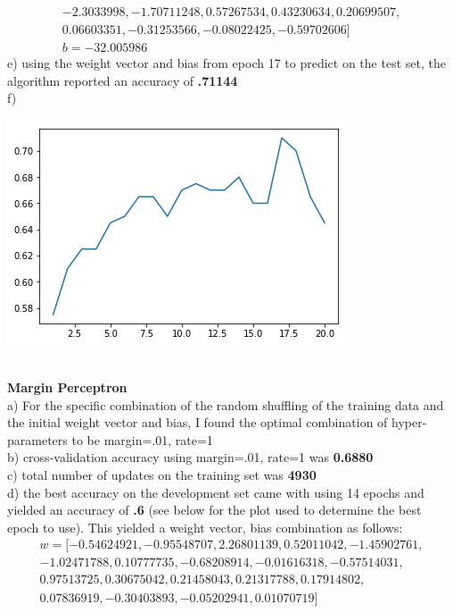 \documentclass[11pt,a4paper]{article}
\begin{document}
\begin{enumerate}
\begin{gather}
			-2.3033998 , -1.70711248,  0.57267534,  0.43230634,  0.20699507,\\
			0.06603351, -0.31253566, -0.08022425, -0.59702606] \\
			b = -32.005986
			\end{gather}
			e) using the weight vector and bias from epoch 17 to predict on the test set, the algorithm reported an accuracy of \textbf{.71144} \\
			f)
			\begin{center}
				\includegraphics[width=0.7\linewidth]{decaying_plot}
			\end{center}
			~\\
			\textbf{Margin Perceptron}    \\
			a) For the specific combination of the random shuffling of the training data and the initial weight vector and bias, I found the optimal combination of hyper-parameters to be margin=.01, rate=1  \\
			b) cross-validation accuracy using margin=.01, rate=1 was \textbf{0.6880}\\
			c) total number of updates on the training set was \textbf{4930}\\
			d) the best accuracy on the development set came with using 14 epochs and yielded an accuracy of \textbf{.6} (see below for the plot used to determine the best epoch to use). This yielded a weight vector, bias combination as follows:\\
			\begin{gather}
			w = [-0.54624921, -0.95548707,  2.26801139,  0.52011042, -1.45902761,\\
			-1.02471788,  0.10777735, -0.68208914, -0.01616318, -0.57514031,\\
			0.97513725,  0.30675042,  0.21458043,  0.21317788,  0.17914802,\\
			0.07836919, -0.30403893, -0.05202941,  0.01070719] \\

\end{gather}
\end{enumerate}
\end{document}
